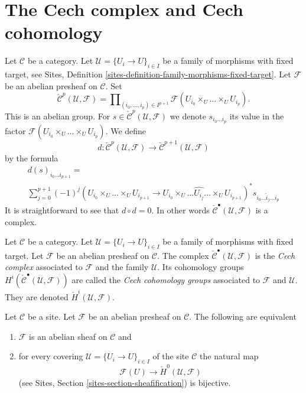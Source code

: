 \section{The Cech complex and Cech cohomology}
\label{section-cech}

\noindent
Let $\mathcal{C}$ be a category.
Let $\mathcal{U} = \{U_i \to U\}_{i \in I}$ be a family of morphisms
with fixed target, see
Sites, Definition \ref{sites-definition-family-morphisms-fixed-target}.
Let $\mathcal{F}$ be an abelian presheaf on $\mathcal{C}$.
Set
$$
\check{\mathcal{C}}^p(\mathcal{U}, \mathcal{F})
=
\prod\nolimits_{(i_0, \ldots, i_p) \in I^{p + 1}}
\mathcal{F}(U_{i_0} \times_U \ldots \times_U U_{i_p}).
$$
This is an abelian group. For
$s \in \check{\mathcal{C}}^p(\mathcal{U}, \mathcal{F})$ we denote
$s_{i_0\ldots i_p}$ its value in the factor
$\mathcal{F}(U_{i_0} \times_U \ldots \times_U U_{i_p})$.
We define
$$
d : \check{\mathcal{C}}^p(\mathcal{U}, \mathcal{F})
\longrightarrow
\check{\mathcal{C}}^{p + 1}(\mathcal{U}, \mathcal{F})
$$
by the formula
\begin{align}
\label{equation-d-cech}
d(s)_{i_0\ldots i_{p + 1}}
= \quad\quad\quad\quad\quad\quad\quad\quad\quad\quad\quad\quad\quad\quad\quad
\\
\sum\nolimits_{j = 0}^{p + 1}
(-1)^j
(U_{i_0} \times_U \ldots \times_U U_{i_{p + 1}}
\longrightarrow
U_{i_0} \times_U \ldots \widehat{U_{i_j}} \ldots \times_U U_{i_{p + 1}})^*
s_{i_0\ldots \hat i_j \ldots i_p} \nonumber
\end{align}
It is straightforward to see that $d \circ d = 0$. In other words
$\check{\mathcal{C}}^\bullet(\mathcal{U}, \mathcal{F})$ is a complex.

\begin{definition}
\label{definition-cech-complex}
Let $\mathcal{C}$ be a category.
Let $\mathcal{U} = \{U_i \to U\}_{i \in I}$ be a
family of morphisms with fixed target.
Let $\mathcal{F}$ be an abelian presheaf on $\mathcal{C}$.
The complex $\check{\mathcal{C}}^\bullet(\mathcal{U}, \mathcal{F})$
is the {\it Cech complex} associated to $\mathcal{F}$ and the
family $\mathcal{U}$. Its cohomology groups
$H^i(\check{\mathcal{C}}^\bullet(\mathcal{U}, \mathcal{F}))$ are
called the {\it Cech cohomology groups} associated to
$\mathcal{F}$ and $\mathcal{U}$.
They are denoted $\check H^i(\mathcal{U}, \mathcal{F})$.
\end{definition}

\begin{lemma}
\label{lemma-cech-h0}
Let $\mathcal{C}$ be a site.
Let $\mathcal{F}$ be an abelian presheaf on $\mathcal{C}$.
The following are equivalent
\begin{enumerate}
\item $\mathcal{F}$ is an abelian sheaf on $\mathcal{C}$ and
\item for every covering $\mathcal{U} = \{U_i \to U\}_{i \in I}$
of the site $\mathcal{C}$ the natural map
$$
\mathcal{F}(U) \to \check{H}^0(\mathcal{U}, \mathcal{F})
$$
(see Sites, Section \ref{sites-section-sheafification}) is bijective.
\end{enumerate}
\end{lemma}

